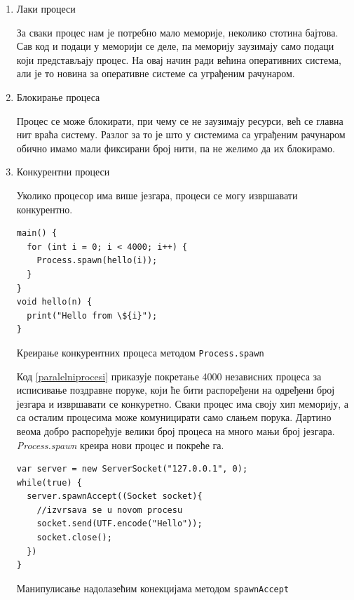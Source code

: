 \documentclass[12pt,oneside]{memoir}
\begin{document}
\begin{enumerate} 
\item Лаки процеси

За сваки процес нам је потребно мало меморије, неколико стотина бајтова. Сав код и подаци у меморији се деле, па меморију заузимају само подаци који представљају процес. На овај начин ради већина оперативних система, али је то новина за оперативне системе са уграђеним рачунаром.

\item Блокирање процеса

Процес се може блокирати, при чему се не заузимају ресурси, већ се главна нит враћа систему. Разлог за то је што у системима са уграђеним рачунаром обично имамо мали фиксирани број нити, па не желимо да их блокирамо. 

\item Конкурентни процеси

Уколико процесор има више језгара, процеси се могу извршавати конкурентно.

\begin{listing}
\begin{verbatim}
main() {
  for (int i = 0; i < 4000; i++) {
    Process.spawn(hello(i));
  }
}
void hello(n) {
  print("Hello from \${i}");
}
\end{verbatim}
\caption{Креирање конкурентних процеса методом \texttt{Process.spawn}}
\label{paralelniprocesi}
\end{listing}

Код \ref{paralelniprocesi} приказује покретање 4000 независних процеса за исписивање поздравне поруке, који ће бити распоређени на одређени број језгара и извршавати се конкуретно. Сваки процес има своју хип меморију, а са осталим процесима може комуницирати само слањем порука. Дартино веома добро распоређује велики број процеса на много мањи број језгара. \textit{Process.spawn} креира нови процес и покреће га.%

\begin{listing}
\begin{verbatim}
var server = new ServerSocket("127.0.0.1", 0);
while(true) {
  server.spawnAccept((Socket socket){
	//izvrsava se u novom procesu
	socket.send(UTF.encode("Hello"));
	socket.close();
  })
}
\end{verbatim}
\caption{Манипулисање надолазећим конекцијама методом \texttt{spawnAccept}}
\label{konekcije}
\end{listing}


\end{enumerate}
\end{document}
